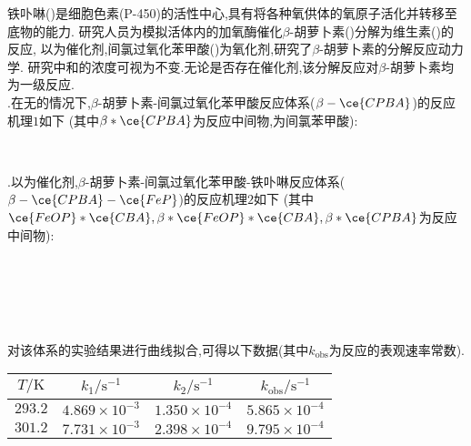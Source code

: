 \documentclass{ctexart}
\begin{document}
\begin{problem}
    铁卟啉()是细胞色素(P-450)的活性中心,具有将各种氧供体的氧原子活化并转移至底物的能力.%
    研究人员为模拟活体内的加氧酶催化$\beta$-胡萝卜素(\ce{$\beta$})分解为维生素()的反应,%
    以为催化剂,间氯过氧化苯甲酸()为氧化剂,研究了$\beta$-胡萝卜素的分解反应动力学.%
    研究中和的浓度可视为不变.无论是否存在催化剂,该分解反应对$\beta$-胡萝卜素均为一级反应.\\
    .在无的情况下,$\beta$-胡萝卜素-间氯过氧化苯甲酸反应体系($\beta-\ce{CPBA}$)的反应机理$1$如下%
    (其中$\beta\ast\ce{CPBA}$为反应中间物,为间氯苯甲酸):
    \begin{tightcenter}
        \\
    \end{tightcenter}
    .以为催化剂,$\beta$-胡萝卜素-间氯过氧化苯甲酸-铁卟啉反应体系($\beta-\ce{CPBA}-\ce{FeP}$)的反应机理$2$如下%
    (其中$\ce{FeOP}\ast\ce{CBA},\beta\ast\ce{FeOP}\ast\ce{CBA},\beta\ast\ce{CPBA}$为反应中间物):
    \begin{tightcenter}
        \\
        \\
        \\
        \\
    \end{tightcenter}
    对该体系的实验结果进行曲线拟合,可得以下数据(其中$k_{\text{obs}}$为反应的表观速率常数).
    \vspace{-5pt}\begin{table}[H]\centering
        \begin{tabular}{|c|c|c|c|}
            \hline
                $T/\text{K}$ & $k_1/\text{s}^{-1}$ & $k_2/\text{s}^{-1}$ & $k_{\text{obs}}/\text{s}^{-1}$ \\ \hline
                $293.2$ & $4.869\times10^{-3}$ & $1.350\times10^{-4}$ & $5.865\times10^{-4}$ \\ \hline
                $301.2$ & $7.731\times10^{-3}$ & $2.398\times10^{-4}$ & $9.795\times10^{-4}$ \\ \hline

\end{tabular}
\end{table}
\end{problem}
\end{document}
